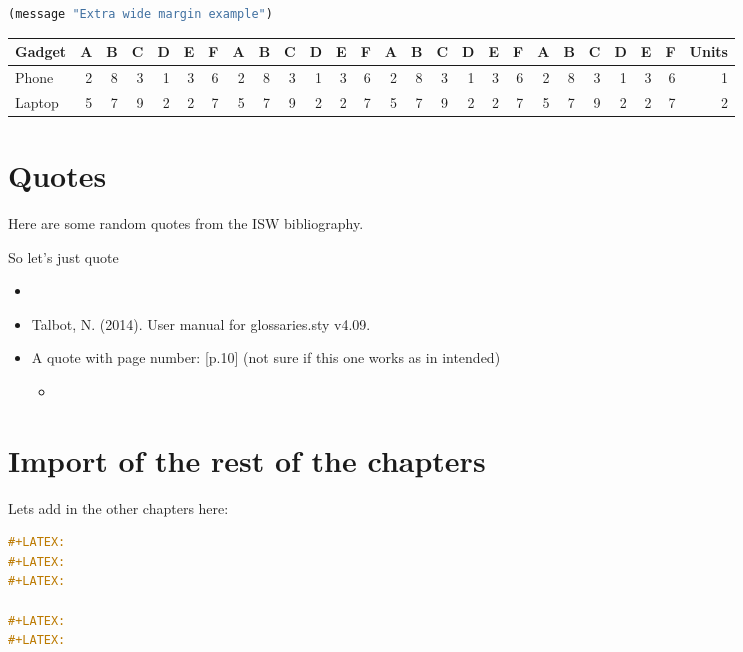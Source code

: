 \documentclass[a4paper,oneside,toc=bibliography,toc=listof]{scrbook}
\newenvironment{extrawidemargin}{
\begin{center}
\begin{adjustwidth}{-2.5cm}{-2.5cm}
}{
\end{adjustwidth}
\end{center}
}
\begin{document}
\begin{extrawidemargin}
\begin{lstlisting}[language=Lisp,numbers=none]
  (message "Extra wide margin example")
\end{lstlisting}

\begin{center}
\begin{tabular}{lrrrrrrrrrrrrrrrrrrrrrrrrr}
Gadget & A & B & C & D & E & F & A & B & C & D & E & F & A & B & C & D & E & F & A & B & C & D & E & F & Units\\
\hline
Phone & 2 & 8 & 3 & 1 & 3 & 6 & 2 & 8 & 3 & 1 & 3 & 6 & 2 & 8 & 3 & 1 & 3 & 6 & 2 & 8 & 3 & 1 & 3 & 6 & 1\\
Laptop & 5 & 7 & 9 & 2 & 2 & 7 & 5 & 7 & 9 & 2 & 2 & 7 & 5 & 7 & 9 & 2 & 2 & 7 & 5 & 7 & 9 & 2 & 2 & 7 & 2\\
\end{tabular}
\end{center}
\end{extrawidemargin}
\chapter{Quotes}
\label{sec:org8632686}

Here are some random quotes from the ISW bibliography.

So let's just quote \cite{Kohm2013}

\begin{itemize}
\item \cite{talbot2014}

\item Talbot, N. (2014). User manual for glossaries.sty v4.09.

\item A quote with page number: \cite{talbot2014}{[}p.10] (not sure if this one works as in intended)

\begin{itemize}
\item \cite{Hoffmann2014}
\end{itemize}
\end{itemize}
\chapter{Import of the rest of the chapters}
\label{sec:org33e130c}
Lets add in the other chapters here:

\begin{lstlisting}[language=org,numbers=none]
#+LATEX: 
#+LATEX: 
#+LATEX: 

#+LATEX: 
#+LATEX: 
\end{lstlisting}
\end{document}
